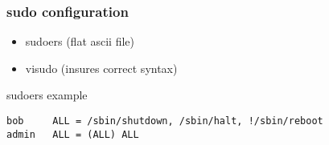 \begin{frame}[fragile]
	\frametitle{sudo configuration}
  \begin{itemize}
    \item sudoers (flat ascii file) 
    \item visudo  (insures correct syntax) 
  \end{itemize} 

  sudoers example
	\begin{lstlisting}
bob     ALL = /sbin/shutdown, /sbin/halt, !/sbin/reboot
admin   ALL = (ALL) ALL
        \end{lstlisting}

\end{frame}
